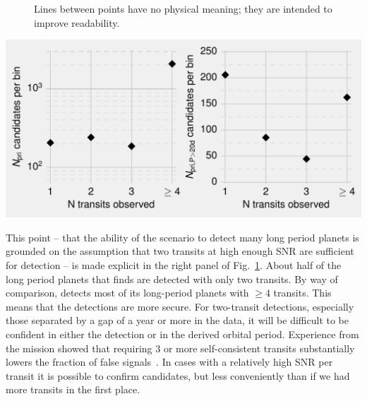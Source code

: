 \begin{enumerate}
\begin{figure}[!t]
{			Lines between points have no physical meaning; they are 
			intended to improve readability.}
		\label{fig:Ntra_hist}
	\end{figure}
	\begin{marginfigure}[-2in]
		\centering
		\includegraphics[scale=1.]{figures/Ntra_histogram_primary.pdf}
		\caption{ 
			Similar to Fig.~\protect\ref{fig:Ntra_hist}, but for the Primary 
			Mission.
		}
		\label{fig:Ntra_hist_primary}
	\end{marginfigure}
	\vspace{-0.47cm}
	This point -- that the ability of the \hemis\:scenario to detect many long 
	period planets is grounded on the assumption that two transits at high 
	enough SNR are sufficient for detection -- is made explicit in the right 
	panel of Fig.~\ref{fig:Ntra_hist}.
	About half of the long period planets that \hemis\:finds are detected with only two transits.
	By way of comparison, \npole\:detects most of its long-period planets with $\ge 4$ transits.
	This means that the \npole\:detections are more secure.
	For two-transit detections, especially those separated by a gap of a year or more in the \tess data, it will be
        difficult to be confident in either the detection or in the derived 
        orbital period.
    Experience from the \kepler mission showed that requiring 3 or more 
    self-consistent transits substantially lowers the fraction of false 
    signals~\citep{burke_Q1Q8_2014}.
	In cases with a relatively high SNR per transit it is possible to confirm 
	candidates, but less conveniently than if we had more transits in the first 
	place.


\end{enumerate}
